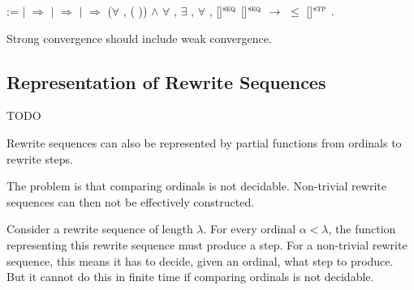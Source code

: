 \begin{singlespace}
\begin{coqdoccode}
:=\coqdoceol
\coqdocindent{1.00em}
 \coqdocvariable{$\varphi$} \coqdoceol
\coqdocindent{1.00em}
\ensuremath{|} 
\coqdocvar{\_}          \ensuremath{\Rightarrow}
\coqdoceol
\coqdocindent{1.00em}
\ensuremath{|} 
\coqdocvar{\_} \coqdocvar{\_} \coqdocvar{$\psi$} \coqdocvar{\_}
\coqdocvar{\_} \ensuremath{\Rightarrow}
\coqdocvariable{$\psi$}\coqdoceol
\coqdocindent{1.00em}
\ensuremath{|} 
\coqdocvar{\_} \coqdocvar{\_}  
\coqdocvar{\_}  \ensuremath{\Rightarrow}\coqdoceol
\coqdocindent{2.00em}
(\ensuremath{\forall} ,
( )) \ensuremath{\land}\coqdoceol
\coqdocindent{2.00em}
\ensuremath{\forall} , \ensuremath{\exists}
\coqdocvar{$\iota$}, \ensuremath{\forall} \coqdocvar{$\kappa$},\coqdoceol
\coqdocindent{3.00em}
\coqdocvariable{$\varphi$}[\coqdocvariable{$\iota$}]$^\textsc{seq}$
\coqdocvariable{$\varphi$}[\coqdocvariable{$\kappa$}]$^\textsc{seq}$
\ensuremath{\rightarrow}\coqdoceol
\coqdocindent{3.00em}
 $\le$
\coqdocvariable{$\varphi$}[\coqdocvariable{$\kappa$}]$^\textsc{stp}$\coqdoceol
\coqdocindent{1.00em}
.\coqdoceol
\end{coqdoccode}
\end{singlespace}
Strong convergence should include weak convergence.


\subsection{Representation of Rewrite Sequences}

TODO

Rewrite sequences can also be represented by partial functions from
ordinals to rewrite steps.

The problem is that comparing ordinals is not decidable. Non-trivial
rewrite sequences can then not be effectively constructed.

Consider a rewrite sequence of length $\lambda$. For every
ordinal $\alpha < \lambda$, the function representing this
rewrite sequence must produce a step. For a non-trivial rewrite
sequence, this means it has to decide, given an ordinal, what step to
produce. But it cannot do this in finite time if comparing ordinals is
not decidable.

